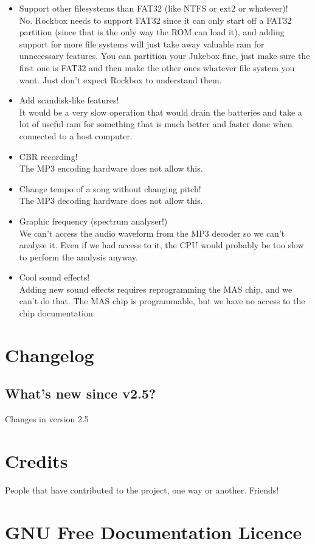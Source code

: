 {\begin{itemize}
  We cannot access information for that kind of visualisation from the MP3 
  decoding hardware.
\item Support other filesystems than FAT32 (like NTFS or ext2 or whatever)!\\
  No. Rockbox needs to support FAT32 since it can only start off a FAT32 
  partition (since that is the only way the ROM can load it), and adding 
  support for more file systems will just take away valuable ram for 
  unnecessary features. You can partition your Jukebox fine, just make sure 
  the first one is FAT32 and then make the other ones whatever file system 
  you want. Just don't expect Rockbox to understand them.
\item Add scandisk{}-like features!\\
  It would be a very slow operation that would drain the batteries and 
  take a lot of useful ram for something that is much better and faster 
  done when connected to a host computer.
\item CBR recording!\\
  The MP3 encoding hardware does not allow this.
\item Change tempo of a song without changing pitch!\\
  The MP3 decoding hardware does not allow this.
\item Graphic frequency (spectrum analyser!)\\
  We can't access the audio waveform from the MP3 decoder so we can't analyse 
  it. Even if we had access to it, the CPU would probably be too slow to 
  perform the analysis anyway.
\item Cool sound effects!\\
  Adding new sound effects requires reprogramming the MAS chip, and we can't 
  do that. The MAS chip is programmable, but we have no access to the chip 
  documentation.
\end{itemize}
}


\chapter{Changelog}
\section{What's new since v2.5?}
Changes in version 2.5

\chapter{Credits}
People that have contributed to the project, one way or another. Friends!
%
\begin{multicols}{2}
\noindent\textsc{\small{}}
\end{multicols}

\chapter{GNU Free Documentation Licence}

